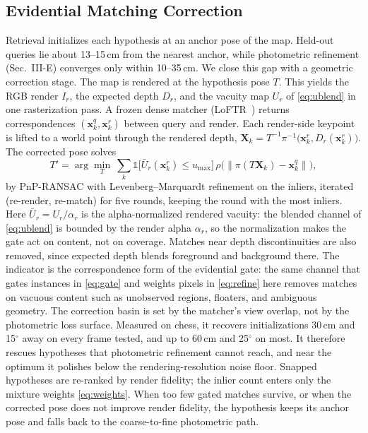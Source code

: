 \documentclass[journal]{IEEEtran}
\begin{document}
\subsection{Evidential Matching Correction}
\label{sec:correction}
Retrieval initializes each hypothesis at an anchor pose of the map. Held-out queries lie about 13--15\,cm from the nearest anchor, while photometric refinement (Sec.~III-E) converges only within 10--35\,cm. We close this gap with a geometric correction stage. The map is rendered at the hypothesis pose $T$. This yields the RGB render $I_r$, the expected depth $D_r$, and the vacuity map $U_r$ of \eqref{eq:ublend} in one rasterization pass. A frozen dense matcher (LoFTR~\cite{loftr}) returns correspondences $(\mathbf{x}_k^q,\mathbf{x}_k^r)$ between query and render. Each render-side keypoint is lifted to a world point through the rendered depth, $\mathbf{X}_k=T^{-1}\pi^{-1}\big(\mathbf{x}_k^r,D_r(\mathbf{x}_k^r)\big)$. The corrected pose solves
\begin{equation}
T'=\arg\min_{T}\ \sum_{k}
\mathbb{1}\big[\bar{U}_r(\mathbf{x}_k^r)\le u_{\max}\big]\,
\rho\big(\big\|\pi(T\mathbf{X}_k)-\mathbf{x}_k^q\big\|\big),
\label{eq:correction}
\end{equation}
by PnP-RANSAC with Levenberg--Marquardt refinement on the inliers, iterated (re-render, re-match) for five rounds, keeping the round with the most inliers. Here $\bar{U}_r=U_r/\alpha_r$ is the alpha-normalized rendered vacuity: the blended channel of \eqref{eq:ublend} is bounded by the render alpha $\alpha_r$, so the normalization makes the gate act on content, not on coverage. Matches near depth discontinuities are also removed, since expected depth blends foreground and background there. The indicator is the correspondence form of the evidential gate: the same channel that gates instances in \eqref{eq:gate} and weights pixels in \eqref{eq:refine} here removes matches on vacuous content such as unobserved regions, floaters, and ambiguous geometry. The correction basin is set by the matcher's view overlap, not by the photometric loss surface. Measured on chess, it recovers initializations 30\,cm and 15$^\circ$ away on every frame tested, and up to 60\,cm and 25$^\circ$ on most. It therefore rescues hypotheses that photometric refinement cannot reach, and near the optimum it polishes below the rendering-resolution noise floor. Snapped hypotheses are re-ranked by render fidelity; the inlier count enters only the mixture weights \eqref{eq:weights}. When too few gated matches survive, or when the corrected pose does not improve render fidelity, the hypothesis keeps its anchor pose and falls back to the coarse-to-fine photometric path.
\end{document}
